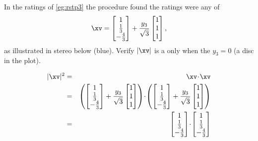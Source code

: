 \begin{example} 
In the  ratings of \cref{eg:rstp3} the procedure found the ratings were any of
\begin{equation*}
\xv=\begin{bmatrix} 1\\\frac13\\-\frac43 \end{bmatrix}
+\frac{y_3}{\sqrt3}\begin{bmatrix} 1\\1\\1 \end{bmatrix},
\end{equation*}
as illustrated in stereo below (blue).
Verify \(|\xv|\) is a  only when the  \(y_3=0\) (a disc in the plot).
\begin{center}
\end{center}
\begin{solution} 
\begin{eqnarray*}
|\xv|^2&=&\xv\cdot\xv
\\&=&\left(\begin{bmatrix} 1\\\frac13\\-\frac43 \end{bmatrix}
+\frac{y_3}{\sqrt3}\begin{bmatrix} 1\\1\\1 \end{bmatrix}\right)
\cdot\left(\begin{bmatrix} 1\\\frac13\\-\frac43 \end{bmatrix}
+\frac{y_3}{\sqrt3}\begin{bmatrix} 1\\1\\1 \end{bmatrix}\right)
\\&=&\begin{bmatrix} 1\\\frac13\\-\frac43 \end{bmatrix}\cdot\begin{bmatrix} 1\\\frac13\\-\frac43 \end{bmatrix}

\end{eqnarray*}
\end{solution}
\end{example}
